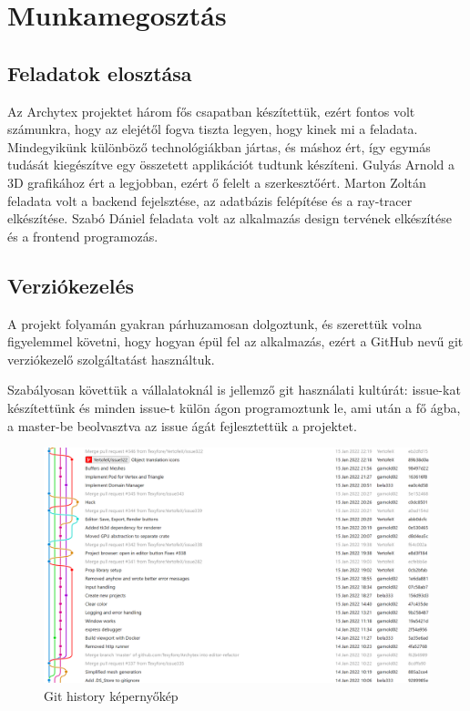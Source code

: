 \section{Munkamegosztás}

\subsection{Feladatok elosztása}
Az Archytex projektet három fős csapatban készítettük, ezért fontos volt számunkra, hogy az elejétől fogva tiszta legyen, hogy kinek mi a feladata. Mindegyikünk különböző technológiákban jártas, és máshoz ért, így egymás tudását kiegészítve egy összetett applikációt tudtunk készíteni. Gulyás Arnold a 3D grafikához ért a legjobban, ezért ő felelt a szerkesztőért. Marton Zoltán feladata volt a backend fejelsztése, az adatbázis felépítése és a ray-tracer elkészítése. Szabó Dániel feladata volt az alkalmazás design tervének elkészítése és a frontend programozás.

\subsection{Verziókezelés}
A projekt folyamán gyakran párhuzamosan dolgoztunk, és szerettük volna figyelemmel követni, hogy hogyan épül fel az alkalmazás, ezért a GitHub nevű git verziókezelő szolgáltatást használtuk.

Szabályosan követtük a vállalatoknál is jellemző git használati kultúrát: issue-kat készítettünk és minden issue-t külön ágon programoztunk le, ami után a fő ágba, a master-be beolvasztva az issue ágát fejlesztettük a projektet.

\begin{figure}[h]
  \centering
  \includegraphics[width=.9\textwidth]{parts/developer-documentation/work/images/git-history.png}
  \caption{Git history képernyőkép}
\end{figure}

